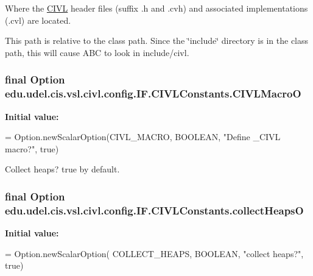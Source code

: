 Where the \hyperlink{classedu_1_1udel_1_1cis_1_1vsl_1_1civl_1_1CIVL}{C\+I\+V\+L} header files (suffix .h and .cvh) and associated implementations (.cvl) are located. 

This path is relative to the class path. Since the \char`\"{}include\char`\"{} directory is in the class path, this will cause A\+B\+C to look in include/civl. \hypertarget{classedu_1_1udel_1_1cis_1_1vsl_1_1civl_1_1config_1_1IF_1_1CIVLConstants_ae46fc49122a4454b55686126de58a913}{}
\subsubsection[{C\+I\+V\+L\+Macro\+O}]{\setlength{\rightskip}{0pt plus 5cm}final Option edu.\+udel.\+cis.\+vsl.\+civl.\+config.\+I\+F.\+C\+I\+V\+L\+Constants.\+C\+I\+V\+L\+Macro\+O\hspace{0.3cm}{\ttfamily [static]}}\label{classedu_1_1udel_1_1cis_1_1vsl_1_1civl_1_1config_1_1IF_1_1CIVLConstants_ae46fc49122a4454b55686126de58a913}
{\bfseries Initial value\+:}
\begin{DoxyCode}
= Option.newScalarOption(CIVL\_MACRO,
            BOOLEAN, \textcolor{stringliteral}{"Define \_CIVL macro?"}, \textcolor{keyword}{true})
\end{DoxyCode}


Collect heaps? true by default. 

\hypertarget{classedu_1_1udel_1_1cis_1_1vsl_1_1civl_1_1config_1_1IF_1_1CIVLConstants_a6fed1cf5d10a176d0f4e779addcea00b}{}
\subsubsection[{collect\+Heaps\+O}]{\setlength{\rightskip}{0pt plus 5cm}final Option edu.\+udel.\+cis.\+vsl.\+civl.\+config.\+I\+F.\+C\+I\+V\+L\+Constants.\+collect\+Heaps\+O\hspace{0.3cm}{\ttfamily [static]}}\label{classedu_1_1udel_1_1cis_1_1vsl_1_1civl_1_1config_1_1IF_1_1CIVLConstants_a6fed1cf5d10a176d0f4e779addcea00b}
{\bfseries Initial value\+:}
\begin{DoxyCode}
= Option.newScalarOption(
            COLLECT\_HEAPS, BOOLEAN, \textcolor{stringliteral}{"collect heaps?"}, \textcolor{keyword}{true})
\end{DoxyCode}


